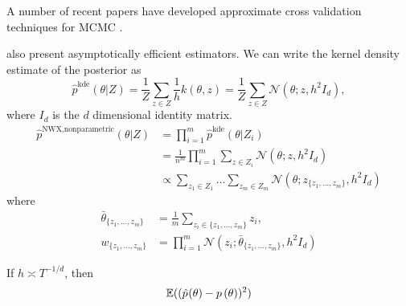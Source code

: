 \documentclass[thesis.tex]{subfiles}
\newcommand{\mse}[1]{}
\newcommand{\eye}[1]{I_{#1}}
\newcommand{\p}[1]{p\left({#1}\right)}
\newcommand{\psup}[2]{\hat p^{#1}({#2})}
\newcommand{\phat}[1]{\psup{}{#1}}
\newcommand{\pkde}[1]{\psup{\text{kde}}{#1}}
\newcommand{\pnp}[1]{\psup{\text{NWX,nonparametric}}{#1}}
\newcommand{\gaussian}[3]{\mathcal N({#1};{#2},{#3})}
\begin{document}
A number of recent papers have developed approximate cross validation techniques for MCMC
\citep{marshall2003approximate,
bhattacharya2007importance,
bornn2010efficient,
held2010posterior,
vehtari2012survey,
li2016approximating}.

\cite{neiswanger2014asymptotically} also present asymptotically efficient estimators.
We can write the kernel density estimate of the posterior as
\begin{equation}
    \pkde{\theta|Z}
    =
    \frac{1}{Z}\sum_{z\in Z}
    \frac{1}{h}k(\theta,z)
    =
    \frac{1}{Z}\sum_{z\in Z}
    \gaussian{\theta}{z}{h^2 \eye d}
    ,
\end{equation}
where $\eye d$ is the $d$ dimensional identity matrix.
\begin{align}
    \pnp{\theta|Z}
    &=
    \prod_{i=1}^m \pkde{\theta|Z_i}
    \\
    &=
    \frac{1}{n^m}
    \prod_{i=1}^m 
    \sum_{z\in Z_i}
    \gaussian{\theta}{z}{h^2 \eye d}
    \\
    &\propto
    \sum_{z_1\in Z_1}
    \dots
    \sum_{z_m\in Z_m}
    \gaussian{\theta}{z_{\{z_1,...,z_m\}}}{h^2 \eye d}
\end{align}
where
\begin{align}
    \bar\theta_{\{z_1,...,z_m\}} 
    &= 
    \frac{1}{m}\sum_{z_i\in\{z_1,...,z_m\}} z_i
    ,
    \\
    w_{\{z_1,...,z_m\}} 
    &=
    \prod_{i=1}^m\gaussian{z_i}{\bar\theta_{\{z_1,...,z_m\}}}{h^2\eye d}
\end{align}

\begin{theorem}
    If $h \asymp T^{-1/d}$,
    then
    \begin{equation}
        \mse{}
        \E((\phat{\theta} - \p{\theta})^2)
    \end{equation}
\end{theorem}

\citet{meeds2015optimization}

\end{document}
